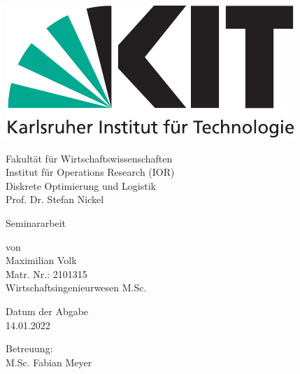\documentclass[12pt,a4paper,twoside]{article}
\theoremstyle{definition}
\numberwithin{equation}{section}
\begin{document}
\begin{titlepage}
  
\begin{center}
	\includegraphics[scale=0.8]{KITlogo_4c_deutsch_RGB.pdf} 

\vspace{1cm}

	\Large{
	Fakultät für Wirtschaftswissenschaften \\
	Institut für Operations Research (IOR) \\
	Diskrete Optimierung und Logistik \\
	Prof. Dr. Stefan Nickel}  
     
\vspace{1cm}

	\Large Seminararbeit %
 
\vspace{1cm}
    
\setlength{\fboxrule}{3pt}

\begin{center}
\end{center}

\vspace{1cm}

	von \\
	Maximilian Volk \\
	Matr. Nr.: 2101315\\
	Wirtschaftsingenieurwesen M.Sc. \\

\vspace{1cm}

	Datum der Abgabe\\
	14.01.2022

\vspace{1cm}
	
	Betreuung: \\
	M.Sc. Fabian Meyer 
    
\end{center}
  
\end{titlepage}
\end{document}
